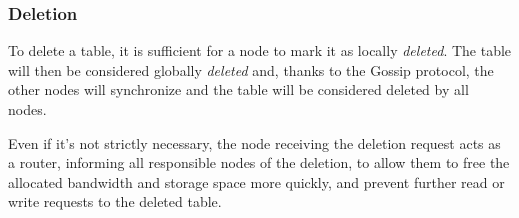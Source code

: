 \subsubsection{Deletion}
\label{subsubsec:deletion}

To delete a table, it is sufficient for a node to mark it as locally
\emph{deleted}.
The table will then be considered globally \emph{deleted} and, thanks to the
Gossip protocol, the other nodes will synchronize and the table will be
considered deleted by all nodes.

Even if it's not strictly necessary, the node receiving the deletion request
acts as a router, informing all responsible nodes of the deletion, to allow
them to free the allocated bandwidth and storage space more quickly, and
prevent further read or write requests to the deleted table.
